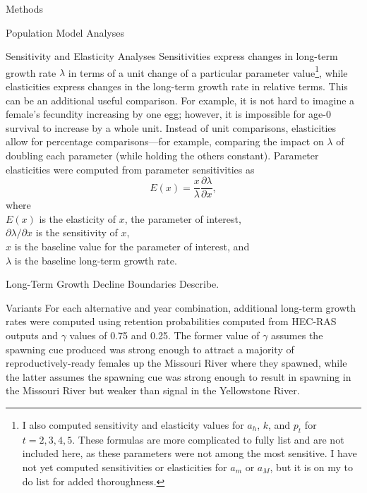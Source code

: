 \documentclass[12pt]{article}
\begin{document}
\begin{section}{Methods}
\begin{subsection}{Population Model Analyses}
\begin{subsubsection}{Sensitivity and Elasticity Analyses}
Sensitivities express changes in long-term growth rate $\lambda$ in terms of a unit change of a particular parameter value\footnote{I also computed sensitivity and elasticity values for $a_h$, $k$, and $p_t$ for $t=2,3,4,5$.  These formulas are more complicated to fully list and are not included here, as these parameters were not among the most sensitive.  I have not yet computed sensitivities or elasticities for $a_m$ or $a_M$, but it is on my to do list for added thoroughness.}, while elasticities express changes in the long-term growth rate in relative terms.  This can be an additional useful comparison.  For example, it is not hard to imagine a female's fecundity increasing by one egg; however, it is impossible for age-0 survival to increase by a whole unit.  Instead of unit comparisons, elasticities allow for percentage comparisons---for example, comparing the impact on $\lambda$ of doubling each parameter (while holding the others constant). Parameter elasticities were computed from parameter sensitivities as
\begin{equation}
E(x)=\frac{x}{\lambda}\frac{\partial\lambda}{\partial x},
\end{equation} 
where\\
\hspace*{0.5cm}$E(x)$ is the elasticity of $x$, the parameter of interest,\\
\hspace*{0.5cm}$\partial\lambda/\partial x$ is the sensitivity of $x$,\\
\hspace*{0.5cm}$x$ is the baseline value for the parameter of interest, and\\
\hspace*{0.5cm}$\lambda$ is the baseline long-term growth rate. 
\end{subsubsection}

\begin{subsubsection}{Long-Term Growth Decline Boundaries}
Describe.
\end{subsubsection}

\begin{subsubsection}{Variants}
For each alternative and year combination, additional long-term growth rates were computed using retention probabilities computed from HEC-RAS outputs and $\gamma$ values of 0.75 and 0.25.  The former value of $\gamma$ assumes the spawning cue produced was strong enough to attract a majority of reproductively-ready females up the Missouri River where they spawned, while the latter assumes the spawning cue was strong enough to result in spawning in the Missouri River but weaker than signal in the Yellowstone River.\\  


\end{subsubsection}
\end{subsection}
\end{section}
\end{document}
